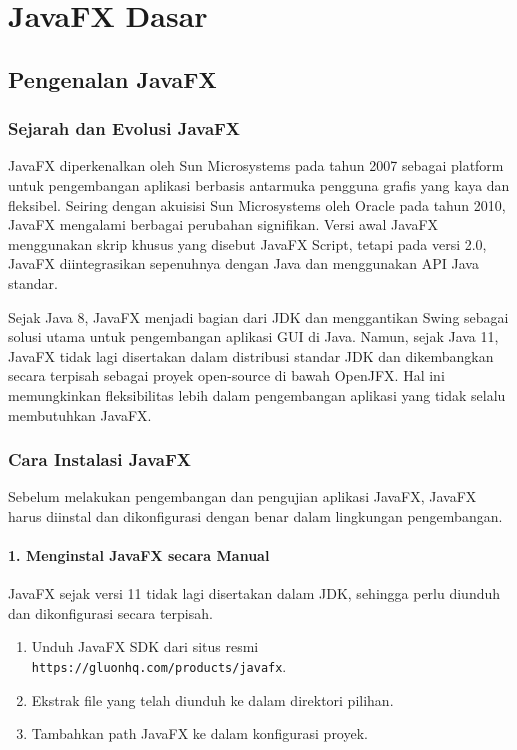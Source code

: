 \chapter{JavaFX Dasar}

\section{Pengenalan JavaFX}

\subsection{Sejarah dan Evolusi JavaFX}

JavaFX diperkenalkan oleh Sun Microsystems pada tahun 2007 sebagai platform untuk pengembangan aplikasi berbasis antarmuka pengguna grafis yang kaya dan fleksibel. Seiring dengan akuisisi Sun Microsystems oleh Oracle pada tahun 2010, JavaFX mengalami berbagai perubahan signifikan. Versi awal JavaFX menggunakan skrip khusus yang disebut JavaFX Script, tetapi pada versi 2.0, JavaFX diintegrasikan sepenuhnya dengan Java dan menggunakan API Java standar.

Sejak Java 8, JavaFX menjadi bagian dari JDK dan menggantikan Swing sebagai solusi utama untuk pengembangan aplikasi GUI di Java. Namun, sejak Java 11, JavaFX tidak lagi disertakan dalam distribusi standar JDK dan dikembangkan secara terpisah sebagai proyek open-source di bawah OpenJFX. Hal ini memungkinkan fleksibilitas lebih dalam pengembangan aplikasi yang tidak selalu membutuhkan JavaFX.

\subsection{Cara Instalasi JavaFX}

Sebelum melakukan pengembangan dan pengujian aplikasi JavaFX, JavaFX harus diinstal dan dikonfigurasi dengan benar dalam lingkungan pengembangan.

\subsubsection{1. Menginstal JavaFX secara Manual}

JavaFX sejak versi 11 tidak lagi disertakan dalam JDK, sehingga perlu diunduh dan dikonfigurasi secara terpisah.

\begin{enumerate}
\item Unduh JavaFX SDK dari situs resmi \texttt{https://gluonhq.com/products/javafx}.
\item Ekstrak file yang telah diunduh ke dalam direktori pilihan.
\item Tambahkan path JavaFX ke dalam konfigurasi proyek.
\end{enumerate}

